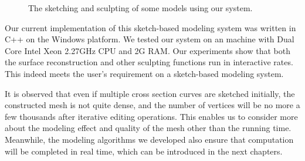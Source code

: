 \begin{figure} [htbp]
  \caption{The sketching and sculpting of some models using our system.}
  \label{fig:models:combine} %
\end{figure}

Our current implementation of this sketch-based modeling system was
written  in C++ on the Windows platform. We tested our system on an
machine with Dual Core Intel Xeon 2.27GHz CPU and 2G RAM. Our
experiments show that both the surface reconstruction and other
sculpting functions run in interactive rates. This indeed meets the
user's requirement on a sketch-based modeling system.

It is observed that even if multiple cross section curves are
sketched  initially, the constructed mesh is not quite dense, and
the number of vertices will be no more a few thousands after
iterative editing operations. This enables us to consider more about
the modeling effect and quality of the mesh other than the running
time. Meanwhile, the modeling algorithms we developed also ensure
that computation will be completed in real time, which can be
introduced in the next chapters.


